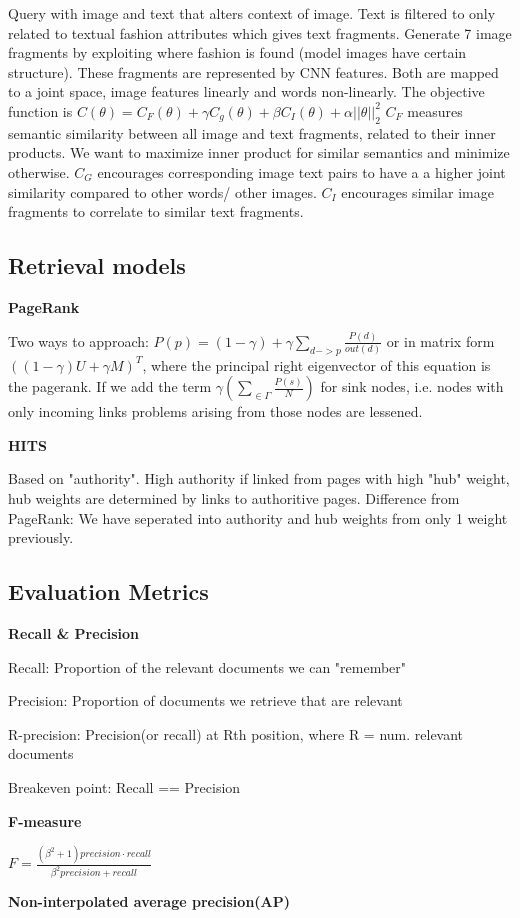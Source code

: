 \documentclass[a4paper,10pt,landscape]{article}
\newcommand{\topic}[1]{\begin{center}\section*{#1}\end{center}}
\begin{document}
\begin{multicols}{3}
Query with image and text that alters context of image.
Text is filtered to only related to textual fashion attributes which gives text fragments.
Generate 7 image fragments by exploiting where fashion is found (model images have certain structure). These fragments are represented by CNN features.
Both are mapped to a joint space, image features linearly and words non-linearly.
The objective function is
$C(\theta) = C_F(\theta)+\gamma C_g(\theta)+\beta C_I(\theta)+\alpha ||\theta||_2^2$
$C_F$ measures semantic similarity between all image and text fragments, related to their inner products. We want to maximize inner product for similar semantics and minimize otherwise.
$C_G$ encourages corresponding image text pairs to have a a higher joint similarity compared to other words/ other images.
$C_I$ encourages similar image fragments to correlate to similar text fragments.

\topic{Retrieval models}

\textbf{PageRank}

Two ways to approach: $P(p) = (1-\gamma)+\gamma\sum_{d->p}\frac{P(d)}{out(d)}$ or in matrix form $((1-\gamma)U + \gamma M)^T$, where the principal right eigenvector of this equation is the pagerank.
If we add the term $\gamma(\sum_{\in\Gamma}\frac{P(s)}{N})$ for sink nodes, i.e. nodes with only incoming links problems arising from those nodes are lessened.

\textbf{HITS}

Based on "authority".
High authority if linked from pages with high "hub" weight, hub weights are determined by links to authoritive pages.
Difference from PageRank: We have seperated into authority and hub weights from only 1 weight previously.

\topic{Evaluation Metrics}

\textbf{Recall & Precision}

Recall: Proportion of the relevant documents we can "remember"

Precision: Proportion of documents we retrieve that are relevant

R-precision: Precision(or recall) at Rth position, where R = num. relevant documents

Breakeven point: Recall == Precision

\textbf{F-measure}

$F = \frac{(\beta^2+1)precision \cdot recall}{\beta^2precision + recall}$

\textbf{Non-interpolated average precision(AP)}


\end{multicols}
\end{document}
